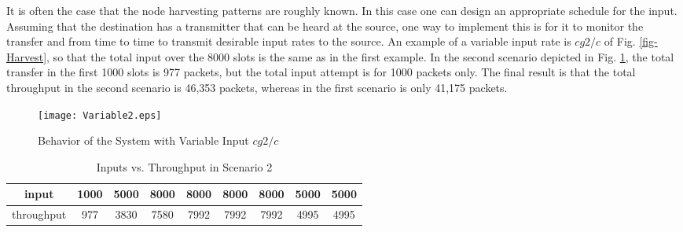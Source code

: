 \documentclass[12 pt]{article}
\newcommand{\debug}[1]{\mbox{\tt #1}}
\renewcommand{\debug}[1]{}              \newcommand{\cmd}[1]{}
\newcommand{\2}{\>\>}
\newcommand{\3}{\>\>\>}
\newcommand{\4}{\>\>\>\>}
\newcommand{\5}{\>\>\>\>\>}
\newcommand{\6}{\>\>\>\>\>\>}
\newcommand{\7}{\6\>}
\newcommand{\8}{\6\2}
\newcommand{\dlabel}[1]{\debug{\fbox{\tiny #1}}\cmd{dlabel}\label{#1}}
\newcommand{\dref}[1]{\ref{#1}\debug{[#1]}\cmd{dref}}
\newcounter{protblock}
\newcounter{line}[protblock]
\begin{document}
It is often the case that the node harvesting patterns are roughly known.  In this case one can design an appropriate schedule for the input.  Assuming that the destination has a transmitter that can be heard at the source, one way to implement this is for it to monitor the transfer and from time to time to transmit desirable input rates to the source.  An example of a variable input rate is $cg2/c$ of Fig. \dref{fig-Harvest}, so that the total input over the 8000 slots is the same as in the first example.  In the second scenario depicted in Fig. \dref{fig-Variable2}, the total transfer in the first 1000 slots is 977 packets, but the total input attempt is for 1000 packets only.  The final result is that the total throughput in the second scenario is 46,353 packets, whereas in the first scenario is only 41,175 packets.

\begin{figure}[hbtp]
\begin{center}
\texttt{[image: Variable2.eps]}
\caption{Behavior of the System with Variable Input $cg2/c$\debug{\fbox{fig-Variable2}}\dlabel{fig-Variable2}}
\end{center}
\end{figure}

\begin{table}[hbtp]
\begin{center}
\begin{tabular}{|c|c|c|c|c|c|c|c|c|}
  \hline
input & 1000 &  5000  &  8000 & 8000 & 8000 & 8000 & 5000 &5000 \\ \hline
throughput &977 &    3830 & 7580 & 7992 & 7992 & 7992 & 4995 & 4995 \\ \hline
\end{tabular}
\caption{Inputs vs. Throughput in Scenario 2\debug{\fbox{Table-Thru2}}\dlabel{Table-Thru2}}
\end{center}
\end{table}
\end{document}
